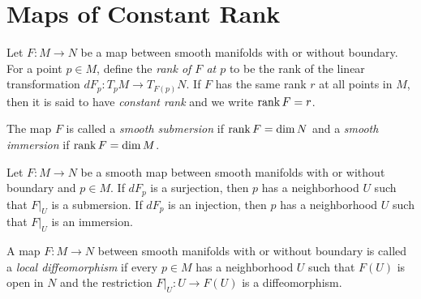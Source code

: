 \section{Maps of Constant Rank}

\begin{definition}
    Let $F: M\to N$ be a map between smooth manifolds with or without boundary. For a point $p\in M$, define the \emph{rank of $F$ at $p$} to be the rank of the linear transformation $dF_p: T_pM\to T_{F(p)}N$. If $F$ has the same rank $r$ at all points in $M$, then it is said to have \emph{constant rank} and we write $\operatorname{rank} F = r$.

    The map $F$ is called a \emph{smooth submersion} if $\operatorname{rank} F = \dim N$ and a \emph{smooth immersion} if $\operatorname{rank} F = \dim M$.
\end{definition}

\begin{proposition}
    Let $F: M\to N$ be a smooth map between smooth manifolds with or without boundary and $p\in M$. If $dF_p$ is a surjection, then $p$ has a neighborhood $U$ such that $F|_U$ is a submersion. If $dF_p$ is an injection, then $p$ has a neighborhood $U$ such that $F|_U$ is an immersion.
\end{proposition}

\begin{definition}
    A map $F: M\to N$ between smooth manifolds with or without boundary is called a \emph{local diffeomorphism} if every $p\in M$ has a neighborhood $U$ such that $F(U)$ is open in $N$ and the restriction $F|_U: U\to F(U)$ is a diffeomorphism.
\end{definition}

